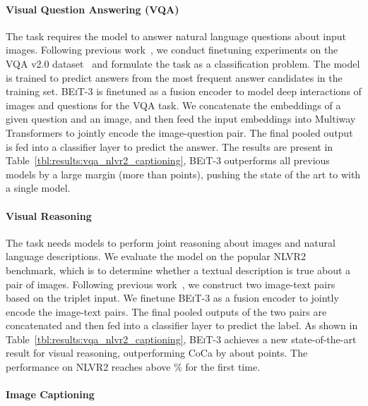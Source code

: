\documentclass{article}
\newcommand\our{\textsc{BEiT-3}}
\newcommand\multiway{Multiway Transformers}
\begin{document}
\paragraph{Visual Question Answering (VQA)} 

The task requires the model to answer natural language questions about input images.
Following previous work~\citep{bottom_up_attn,vinvl,vilt}, we conduct finetuning experiments on the VQA v2.0 dataset~\citep{vqa} and formulate the task as a classification problem.
The model is trained to predict answers from the  most frequent answer candidates in the training set.
\our{} is finetuned as a fusion encoder to model deep interactions of images and questions for the VQA task.
We concatenate the embeddings of a given question and an image, and then feed the input embeddings into \multiway{} to jointly encode the image-question pair.
The final pooled output is fed into a classifier layer to predict the answer.
The results are present in Table~\ref{tbl:results:vqa_nlvr2_captioning}, \our{} outperforms all previous models by a large margin (more than  points), pushing the state of the art to  with a single model.

\paragraph{Visual Reasoning}
The task needs models to perform joint reasoning about images and natural language descriptions.
We evaluate the model on the popular NLVR2~\citep{nlvr2} benchmark, which is to determine whether a textual description is true about a pair of images.
Following previous work~\citep{vinvl,vilt}, we construct two image-text pairs based on the triplet input.
We finetune \our{} as a fusion encoder to jointly encode the image-text pairs.
The final pooled outputs of the two pairs are concatenated and then fed into a classifier layer to predict the label. 
As shown in Table~\ref{tbl:results:vqa_nlvr2_captioning}, \our{} achieves a new state-of-the-art result for visual reasoning, outperforming CoCa by about  points. 
The performance on NLVR2 reaches above \% for the first time.

\paragraph{Image Captioning}
\end{document}
